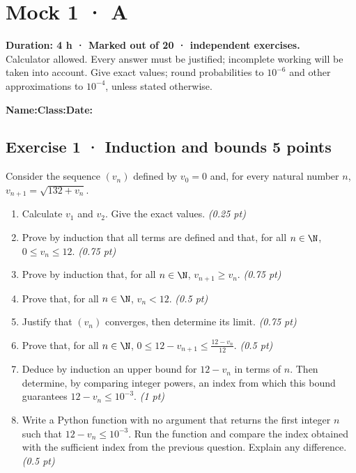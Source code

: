 \fi

\ifmxteacher

\mxnewpage{}\label{sujet:5-3}

\section*{Mock 1 · A}


\textbf{Duration: 4 h · Marked out of 20 ·  independent exercises.}\\Calculator allowed. Every answer must be justified; incomplete working will be taken into account. Give exact values; round probabilities to $10^{-6}$ and other approximations to $10^{-4}$, unless stated otherwise.

\smallskip\textbf{Name:}\enspace\dotfill\quad\textbf{Class:}\enspace\dotfill\quad\textbf{Date:}\enspace\dotfill

\subsection*{Exercise 1 · Induction and bounds \hfill 5 points}Consider the sequence $(v_n)$ defined by $v_0=0$ and, for every natural number $n$, $v_{n+1}=\sqrt{132+v_n}$.

\begin{enumerate}

\item Calculate $v_1$ and $v_2$. Give the exact values. \hfill\textit{(0.25 pt)}

\item Prove by induction that all terms are defined and that, for all $n\in\N$, $0\le v_n\le12$. \hfill\textit{(0.75 pt)}

\item Prove by induction that, for all $n\in\N$, $v_{n+1}\ge v_n$. \hfill\textit{(0.75 pt)}

\item Prove that, for all $n\in\N$, $v_n<12$. \hfill\textit{(0.5 pt)}

\item Justify that $(v_n)$ converges, then determine its limit. \hfill\textit{(0.75 pt)}

\item Prove that, for all $n\in\N$, $0\le 12-v_{n+1}\le\frac{12-v_n}{12}$. \hfill\textit{(0.5 pt)}

\item Deduce by induction an upper bound for $12-v_n$ in terms of $n$. Then determine, by comparing integer powers, an index from which this bound guarantees $12-v_n\le10^{-3}$. \hfill\textit{(1 pt)}

\item Write a Python function with no argument that returns the first integer $n$ such that $12-v_n\le10^{-3}$. Run the function and compare the index obtained with the sufficient index from the previous question. Explain any difference. \hfill\textit{(0.5 pt)}

\end{enumerate}

